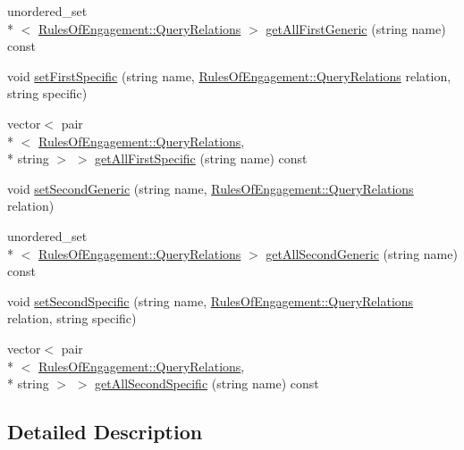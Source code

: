 \begin{DoxyCompactItemize}
\item 
unordered\-\_\-set\\*
$<$ \hyperlink{class_rules_of_engagement_a5e08db2a0638b98dbb06ad923a33d817}{Rules\-Of\-Engagement\-::\-Query\-Relations} $>$ \hyperlink{class_synonym_table_a1ce11124100f9c373d2f6ce8ddfddb17}{get\-All\-First\-Generic} (string name) const 
\item 
void \hyperlink{class_synonym_table_af4b3fd34501ea9f92dcebda98fbd2a75}{set\-First\-Specific} (string name, \hyperlink{class_rules_of_engagement_a5e08db2a0638b98dbb06ad923a33d817}{Rules\-Of\-Engagement\-::\-Query\-Relations} relation, string specific)
\item 
vector$<$ pair\\*
$<$ \hyperlink{class_rules_of_engagement_a5e08db2a0638b98dbb06ad923a33d817}{Rules\-Of\-Engagement\-::\-Query\-Relations}, \\*
string $>$ $>$ \hyperlink{class_synonym_table_a6b4336ed735c5c35523762d651d85717}{get\-All\-First\-Specific} (string name) const 
\item 
void \hyperlink{class_synonym_table_a0cf7b481bc92f4d3eb3c035972e2b10f}{set\-Second\-Generic} (string name, \hyperlink{class_rules_of_engagement_a5e08db2a0638b98dbb06ad923a33d817}{Rules\-Of\-Engagement\-::\-Query\-Relations} relation)
\item 
unordered\-\_\-set\\*
$<$ \hyperlink{class_rules_of_engagement_a5e08db2a0638b98dbb06ad923a33d817}{Rules\-Of\-Engagement\-::\-Query\-Relations} $>$ \hyperlink{class_synonym_table_ae54541fe25ecfccc4f789a0d8e8ed965}{get\-All\-Second\-Generic} (string name) const 
\item 
void \hyperlink{class_synonym_table_af9b50ce5b3b83f1804ce0a19c9a5affc}{set\-Second\-Specific} (string name, \hyperlink{class_rules_of_engagement_a5e08db2a0638b98dbb06ad923a33d817}{Rules\-Of\-Engagement\-::\-Query\-Relations} relation, string specific)
\item 
vector$<$ pair\\*
$<$ \hyperlink{class_rules_of_engagement_a5e08db2a0638b98dbb06ad923a33d817}{Rules\-Of\-Engagement\-::\-Query\-Relations}, \\*
string $>$ $>$ \hyperlink{class_synonym_table_ae43db38b70a46ebb35f4a2392a40ef64}{get\-All\-Second\-Specific} (string name) const 
\end{DoxyCompactItemize}


\subsection{Detailed Description}


